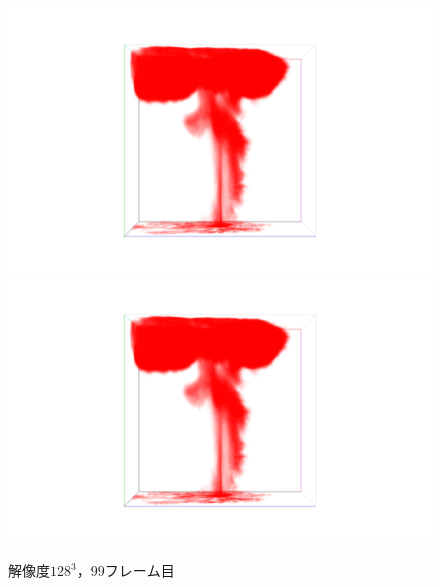 \documentclass[a4j,12pt]{jreport}
\begin{document}

\begin{figure}[htbp]
\caption{$解像度128^3，99フレーム目$}
\includegraphics[width=140mm]{images/n128_f99_dev2.png}
\includegraphics[width=140mm]{images/n128_f99_dev2.png}
\label{fig:n128_f99}
\end{figure}
\end{document}
